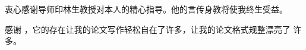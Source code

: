 

\begin{ack}
  衷心感谢导师印林生教授对本人的精心指导。他的言传身教将使我终生受益。

  感谢 \thuthesis，它的存在让我的论文写作轻松自在了许多，让我的论文格式规整漂亮了
  许多。
\end{ack}
